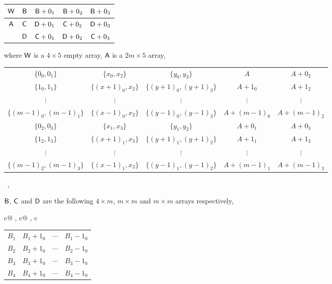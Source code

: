 \documentclass[draft, 11pt]{article}
\begin{document}
 
 \begin{figure}

\renewcommand{\arraystretch}{2}
\setlength{\tabcolsep}{5pt} \centering

\begin{tabular}{|c|c|c|c|c|}
\hline
${\sf W}$				    & ${\sf B}$  & ${\sf B}+0_1$   & ${\sf B}+0_2$ & ${\sf B}+0_3$  \\\hline
\multirow{2}{*}{${\sf A}$}         & ${\sf C}$  & ${\sf D}+0_1$  &  ${\sf C}+0_2$ & ${\sf D}+0_3$  \\\cline{2-5}
                                        & ${\sf D}$  & ${\sf C}+0_1$  &  ${\sf D}+0_2$ & ${\sf C}+0_3$  \\ \hline
\end{tabular}
\vskip 5pt
\small
\flushleft where ${\sf W}$ is a $4\times 5$ empty array, ${\sf A}$ is a $2m\times 5$ array,
\vskip 5pt
\renewcommand{\arraystretch}{1.2}
\setlength{\tabcolsep}{2pt} 
\centering \small
\begin{tabular}{|ccc|cc|}
\hline
$\{0_0,0_1\}$ & $\{x_0,x_2\}$ & $\{y_0,y_3\}$ 
& $A$ & $A+0_2$ \\
$\{1_0,1_1\}$ & $\{(x+1)_0,x_2\}$ & $\{(y+1)_0,(y+1)_3\}$ 
& $A+1_0$ & $A+1_2$ \\
$\vdots$ & $\vdots$ & $\vdots$ & $\vdots$ & $\vdots$ \\
$\{(m-1)_0,(m-1)_1\}$ & $\{(x-1)_0,x_2\}$ & $\{(y-1)_0,(y-1)_3\}$ 
& $A+(m-1)_0$ & $A+(m-1)_2$\\
\hline
$\{0_2,0_3\}$ & $\{x_1,x_3\}$ & $\{y_1,y_2\}$ 
& $A+0_1$ & $A+0_3$\\
$\{1_2,1_3\}$ & $\{(x+1)_1,x_3\}$ & $\{(y+1)_1,(y+1)_2\}$ 
& $A+1_1$ & $A+1_3$\\
$\vdots$ & $\vdots$ & $\vdots$ & $\vdots$ & $\vdots$ \\
$\{(m-1)_2,(m-1)_3\}$ & $\{(x-1)_1,x_3\}$ & $\{(y-1)_1,(y-1)_2\}$ 
& $A+(m-1)_1$ & $A+(m-1)_3$\\
\hline
\end{tabular}\ ,


\vskip 5pt
\flushleft\normalsize ${\sf B}$, ${\sf C}$ and ${\sf D}$ are the following $4\times m$, $m\times m$ and $m\times m$ arrays respectively,
\vskip 5pt
\renewcommand{\arraystretch}{1.2}
\setlength{\tabcolsep}{1pt} 
\centering \small
\begin{tabular}{c@{ , }c@{ , }c}
\begin{tabular}{|cccc|}
\hline
$B_1$ & $B_1+1_0$ & $\cdots$ & $B_1-1_0$ \\ 
$B_2$ & $B_2+1_0$ & $\cdots$ & $B_2-1_0$ \\ 
$B_3$ & $B_3+1_0$ & $\cdots$ & $B_3-1_0$ \\
$B_4$ & $B_4+1_0$ & $\cdots$ & $B_4-1_0$ \\  


\end{tabular}
\end{tabular}
\end{figure}
\end{document}
